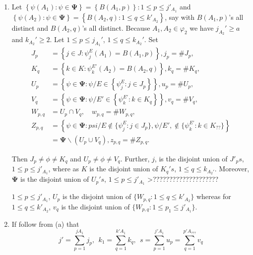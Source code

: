 \documentclass[a4paper,12pt]{article}
\theoremstyle{definition}
\theoremstyle{underlinethm}
\theoremstyle{definition}
\begin{document}
\begin{enumerate}[label=(\alph*)]
\item Let $\left\{\psi(A_{1}) : \psi \in \boldsymbol{\Psi}\right\} = \left\{B(A_{1}, p)\right\} : 1 \leq p \leq j'_{A_{1}}$ and $\left\{\psi (A_{2}) : \psi \in \boldsymbol{\Psi}\right\} = \left\{B(A_{2}, q) : 1 \leq q \leq k'_{A_{2}}\right\}$, say with $B(A_{1}, p)$'s all distinct and $B(A_{2}, q)$'s all distinct. Because $A_{1}, A_{2} \in \varphi_{2}$ we have $j_{A_{2}}' \geq a$ and $k_{A_{2}}' \geq 2$. Let $1 \leq p \leq j_{A_{1}}'$, $1 \leq q \leq k_{A_{2}}'$. Set 
\begin{align*}
J_{p} &= \left\{j \in J  : \psi_{j}^{E} (A_{1}) = B(A_{1}, p)\right\}, j_{p} = \# J_{p},\\
K_{q} & = \left\{k \in K : \psi_{k}^{E'} (A_{2}) = B(A_{2}, q)\right\}, k_{q} = \# K_{q},\\
U_{p} & = \left\{\psi \in \boldsymbol{\Psi} : \psi / E \in \left\{\psi_{j}^{E} : j \in J_{p}\right\}\right\}, u_{p} = \# U_{p},\\
V_{q} & = \left\{\psi \in \boldsymbol{\Psi} : \psi/E' \in \left\{\psi_{k}^{E'} : k \in K_{q}\right\} \right\}, v_{q} = \# V_{q},\\
W_{p,q} & = U_{p} \cap V_{q},\quad w_{p, q} = \# W_{p,q},\\
Z_{p,q} & = \left\{\psi \in \boldsymbol{\Psi} : psi /E \notin \{ \psi_{j}^{E} : j \in J_{p}\}, \psi/E', \notin \{\psi_{k}^{E'} : k \in K_{??}\} \right\}\\
 & = \boldsymbol{\Psi} \smallsetminus (U_{p} \cup V_{q}), z_{p,q} = \# Z_{p,q}.
\end{align*}

Then $J_{p} \neq \phi \neq K_{q}$ and $U_{p} \neq \phi \neq V_{q}$. Further, $j$, is the disjoint union of $J'_{p} s$, $1 \leq p \leq j'_{A_{1}}$, where as $K$ is the disjoint union of $K_{q}'s$, $1 \leq q \leq k_{A_{2}'}$. Moreover, $\boldsymbol{\Psi}$ is the disjoint union of $U_{p}'s$, $1 \leq p \leq j'_{A_{1}}$ >????????????????????

$1 \leq p \leq j'_{A_{1}}$, $U_{p}$ is the disjoint union of $\{W_{p,q} : 1 \leq q \leq k'_{A_{2}} \}$ whereas for $1 \leq q \leq k'_{A_{2}}$, $v_{q}$ is the disjoint union of $\{W_{p,q} : 1 \leq p_{1} \leq j'_{A_{1}}\}$.

\item If follow from (a) that 
\begin{equation}
j' = \sum_{p=1}^{jA_{1}} j_{p}, ~~ k_{1} = \sum_{q=1}^{k'A_{1}} k_{q},~~ s= \sum_{p=1}^{j'A_{1}} u_{p}= \sum_{q=1}^{p'A_{???}}v_{q}\tag{3.62}\label{eq-3.62}
\end{equation}


\end{enumerate}
\end{document}
